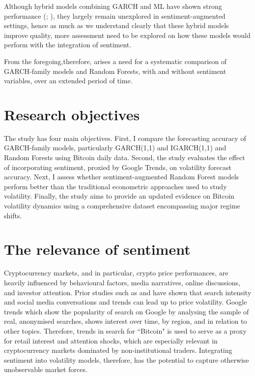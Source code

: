 \documentclass[12pt]{report}
\begin{document}
Although hybrid models combining GARCH and ML have shown strong performance (\cite{zahidetal2022hybridgarch}; \cite{han2025combinedmethod}), they largely remain unexplored in sentiment-augmented settings, hence as much as we understand clearly that these hybrid models improve quality, more assessment need to be explored on how these models would perform with the integration of sentiment.

From the foregoing,therefore, arises a need for a systematic comparison of GARCH-family models and Random Forests, with and without sentiment variables, over an extended period of time.

\section{Research objectives}

The study has four main objectives. First, I compare the forecasting accuracy of GARCH-family models, particularly GARCH(1,1) and IGARCH(1,1) and Random Forests using Bitcoin daily data. Second, the study evaluates the effect of incorporating sentiment, proxied by Google Trends, on volatility forecast accuracy. Next, I assess whether sentiment-augmented Random Forest models perform better than the traditional econometric approaches used to study volatility. Finally, the study aims to provide an updated evidence on Bitcoin volatility dynamics using a comprehensive dataset encompassing major regime shifts.


\section{The relevance of sentiment}

Cryptocurrency markets, and in particular, crypto price performances, are heavily influenced by behavioural factors, media narratives, online discussions, and investor attention. Prior studies such as \cite{mai2018silentmajority} and \cite{sapkota2022newsbitcoin} have shown that search intensity and social media conversations and trends can lead up to price volatility. Google trends which show the popularity of search on Google by analysing the sample of real, anonymised searches, shows interest over time, by region, and in relation to other topics. Therefore, trends in search for ``Bitcoin" is used to serve as a proxy for retail interest and attention shocks, which are especially relevant in cryptocurrency markets dominated by non-institutional traders. Integrating sentiment into volatility models, therefore, has the potential to capture otherwise unobservable market forces.
\end{document}
